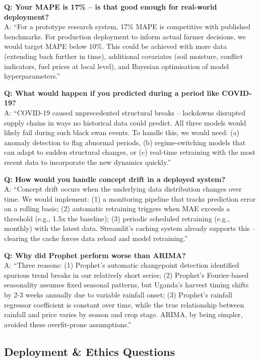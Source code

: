 \documentclass[11pt,a4paper]{article}
\begin{document}
\textbf{Q: Your MAPE is 17\% -- is that good enough for real-world deployment?}\\
A: ``For a prototype research system, 17\% MAPE is competitive with published benchmarks. For production deployment to inform actual farmer decisions, we would target MAPE below 10\%. This could be achieved with more data (extending back further in time), additional covariates (soil moisture, conflict indicators, fuel prices at local level), and Bayesian optimisation of model hyperparameters.''

\textbf{Q: What would happen if you predicted during a period like COVID-19?}\\
A: ``COVID-19 caused unprecedented structural breaks -- lockdowns disrupted supply chains in ways no historical data could predict. All three models would likely fail during such black swan events. To handle this, we would need: (a) anomaly detection to flag abnormal periods, (b) regime-switching models that can adapt to sudden structural changes, or (c) real-time retraining with the most recent data to incorporate the new dynamics quickly.''

\textbf{Q: How would you handle concept drift in a deployed system?}\\
A: ``Concept drift occurs when the underlying data distribution changes over time. We would implement: (1) a monitoring pipeline that tracks prediction error on a rolling basis; (2) automatic retraining triggers when MAE exceeds a threshold (e.g., 1.5x the baseline); (3) periodic scheduled retraining (e.g., monthly) with the latest data. Streamlit's caching system already supports this -- clearing the cache forces data reload and model retraining.''

\textbf{Q: Why did Prophet perform worse than ARIMA?}\\
A: ``Three reasons: (1) Prophet's automatic changepoint detection identified spurious trend breaks in our relatively short series; (2) Prophet's Fourier-based seasonality assumes fixed seasonal patterns, but Uganda's harvest timing shifts by 2-3 weeks annually due to variable rainfall onset; (3) Prophet's rainfall regressor coefficient is constant over time, while the true relationship between rainfall and price varies by season and crop stage. ARIMA, by being simpler, avoided these overfit-prone assumptions.''

\subsection{Deployment \& Ethics Questions}
\end{document}
